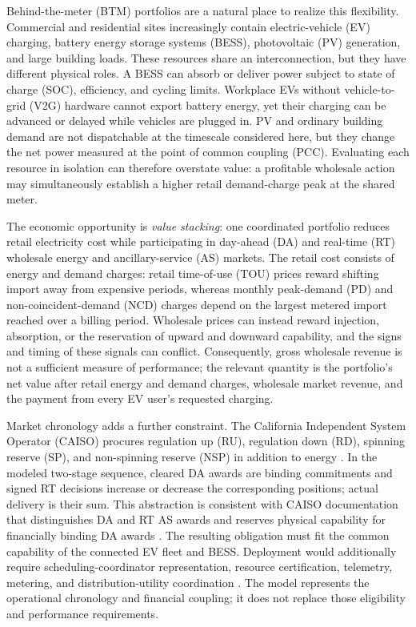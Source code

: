 \documentclass[final,5p,times]{elsarticle}
\begin{document}
Behind-the-meter (BTM) portfolios are a natural place to realize this flexibility. Commercial and residential sites increasingly contain electric-vehicle (EV) charging, battery energy storage systems (BESS), photovoltaic (PV) generation, and large building loads. These resources share an interconnection, but they have different physical roles. A BESS can absorb or deliver power subject to state of charge (SOC), efficiency, and cycling limits. Workplace EVs without vehicle-to-grid (V2G) hardware cannot export battery energy, yet their charging can be advanced or delayed while vehicles are plugged in. PV and ordinary building demand are not dispatchable at the timescale considered here, but they change the net power measured at the point of common coupling (PCC). Evaluating each resource in isolation can therefore overstate value: a profitable wholesale action may simultaneously establish a higher retail demand-charge peak at the shared meter.

The economic opportunity is \emph{value stacking}: one coordinated portfolio reduces retail electricity cost while participating in day-ahead (DA) and real-time (RT) wholesale energy and ancillary-service (AS) markets. The retail cost consists of energy and demand charges: retail time-of-use (TOU) prices reward shifting import away from expensive periods, whereas monthly peak-demand (PD) and non-coincident-demand (NCD) charges depend on the largest metered import reached over a billing period. Wholesale prices can instead reward injection, absorption, or the reservation of upward and downward capability, and the signs and timing of these signals can conflict. Consequently, gross wholesale revenue is not a sufficient measure of performance; the relevant quantity is the portfolio's net value after retail energy and demand charges, wholesale market revenue, and the payment from every EV user's requested charging.

Market chronology adds a further constraint. The California Independent System Operator (CAISO) procures regulation up (RU), regulation down (RD), spinning reserve (SP), and non-spinning reserve (NSP) in addition to energy \cite{caisoAncillary2026}. In the modeled two-stage sequence, cleared DA awards are binding commitments and signed RT decisions increase or decrease the corresponding positions; actual delivery is their sum. This abstraction is consistent with CAISO documentation that distinguishes DA and RT AS awards and reserves physical capability for financially binding DA awards \cite{caisoMarketOperations2026} \cite{caisoNGRCommitment2020}. The resulting obligation must fit the common capability of the connected EV fleet and BESS. Deployment would additionally require scheduling-coordinator representation, resource certification, telemetry, metering, and distribution-utility coordination \cite{caisoDER2026}. The model represents the operational chronology and financial coupling; it does not replace those eligibility and performance requirements.
\end{document}
